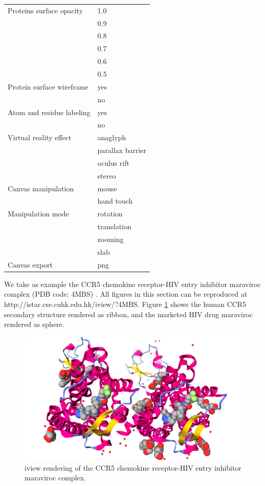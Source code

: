 \begin{table}
\begin{tabular}{ll}
\hline
 Proteins surface opacity & 1.0\\
                          & 0.9\\
                          & 0.8\\
                          & 0.7\\
                          & 0.6\\
                          & 0.5\\
\hline
Protein surface wireframe & yes\\
                          & no\\
\hline
Atom and residue labeling & yes\\
                          & no\\
\hline
   Virtual reality effect & anaglyph\\
                          & parallax barrier\\
                          & oculus rift\\
                          & stereo\\
\hline
      Canvas manipulation & mouse\\
                          & hand touch\\
\hline
        Manipulation mode & rotation\\
                          & translation\\
                          & zooming\\
                          & slab\\
\hline
            Canvas export & png\\
\hline
\end{tabular}
\end{table}

We take as example the CCR5 chemokine receptor-HIV entry inhibitor maraviroc complex (PDB code: 4MBS) \citep{1348}. All figures in this section can be reproduced at http://istar.cse.cuhk.edu.hk/iview/?4MBS. Figure \ref{fig:ribbon} shows the human CCR5 secondary structure rendered as ribbon, and the marketed HIV drug maraviroc rendered as sphere.

\begin{figure}
\begin{center}
\includegraphics{../iview/ribbon.png}
\end{center}
\caption{iview rendering of the CCR5 chemokine receptor-HIV entry inhibitor maraviroc complex.}
\label{fig:ribbon}
\end{figure}

